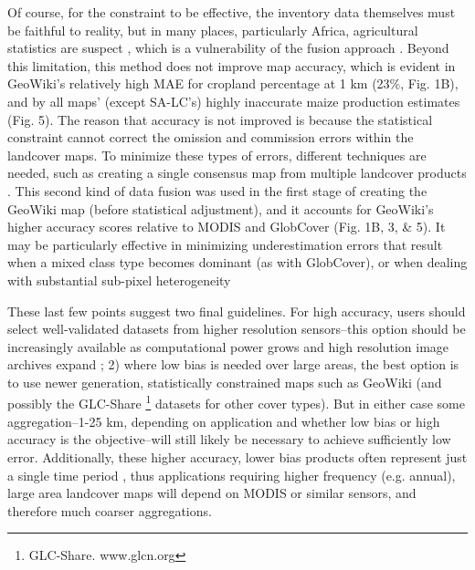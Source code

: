\documentclass{pnastwo}
\begin{document}
\begin{article}

Of course, for the constraint to be effective, the inventory data themselves must be faithful to reality, but in many places, particularly Africa, agricultural statistics are suspect \cite{carletto_emperor_2013, fao_action_2013}, which is a vulnerability of the fusion approach \cite{see_improved_2015}. Beyond this limitation, this method does not improve map accuracy, which is evident in GeoWiki's relatively high MAE for cropland percentage at 1 km (23\%, Fig. 1B), and by all maps' (except SA-LC's) highly inaccurate maize production estimates (Fig. 5). The reason that accuracy is not improved is because the statistical constraint cannot correct the omission and commission errors within the landcover maps. To minimize these types of errors, different techniques are needed, such as creating a single consensus map from multiple landcover products \cite[e.g.][]{fritz_comparison_2010,tuanmu_global_2014}. This second kind of data fusion was used in the first stage of creating the GeoWiki map (before statistical adjustment), and it accounts for GeoWiki's higher accuracy scores relative to MODIS and GlobCover (Fig. 1B, 3, \& 5). It may be particularly effective in minimizing underestimation errors that result when a mixed class type becomes dominant (as with GlobCover), or when dealing with substantial sub-pixel heterogeneity \cite{fritz_mapping_2015,tuanmu_global_2014}

These last few points suggest two final guidelines. For high accuracy, users should select well-validated datasets from higher resolution sensors--this option should be increasingly available as computational power grows and high resolution image archives expand \cite{hansen_high-resolution_2013,chen_global_2015}; 2) where low bias is needed over large areas, the best option is to use newer generation, statistically constrained maps such as GeoWiki (and possibly the GLC-Share \footnote{GLC-Share. www.glcn.org} datasets for other cover types). But in either case some aggregation--1-25 km, depending on application and whether low bias or high accuracy is the objective--will still likely be necessary to achieve sufficiently low error. Additionally, these higher accuracy, lower bias products often represent just a single time period \cite[e.g.][]{fritz_mapping_2015,tuanmu_global_2014}, thus applications requiring higher frequency (e.g. annual), large area landcover maps will depend on MODIS or similar sensors, and therefore much coarser aggregations.  


\end{article}
\end{document}
